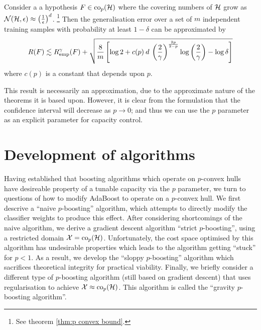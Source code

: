 \begin{theorem}
\label{thm:p convex generalisation}
Consider a a hypothesis $F \in \mathrm{co}_p(\mathcal{H})$ where the covering
numbers of $\mathcal{H}$ grow as $\mathcal{N}({\mathcal{H}}, {\epsilon}) \approx \left
( \frac{1}{\epsilon} \right) ^d$.%
\footnote{See theorem \ref{thm:p convex bound}.}
Then the generalisation error over a set of $m$ independent training
samples with probability at least $1 - \delta$ can be approximated by 
%
\begin{equation}
R(F) \lesssim R_{\mathrm{emp}}^{\gamma}(F) + \sqrt{ \frac{8}{m} \left[ \log 2
+ c(p) \: d \: \left( \frac{2}{\gamma} \right)^{\frac{2p}{2-p}} \log
\left( \frac{2}{\gamma} \right) - \log \delta \right]}
\end{equation}
where $c(p)$ is a constant that depends upon $p$. 
%
\end{theorem}

This result is necessarily an approximation, due to the approximate
nature of the theorems it is based upon.  However, it is clear from
the formulation that the confidence interval will decrease as $p
\rightarrow 0$; and thus we can use the $p$ parameter as an explicit
parameter for capacity control.


\section{Development of algorithms}

Having established that boosting algorithms which operate on
$p$-convex hulls have desireable property of a tunable capacity via
the $p$ parameter, we turn to
questions of how to modify AdaBoost to operate on a $p$-convex hull.
We first descrive a ``naive $p$-boosting'' algorithm, which attempts
to directly modify the classifier weights to produce this effect.
After considering shortcomings of the naive algorithm, we derive a	
gradient descent algorithm ``strict $p$-boosting'', using a restricted
domain $\mathcal{X} = \mathrm{co}_p (\mathcal{H})$.  Unfortunately, the cost space
optimised by this algorithm has undesirable properties which leads to
the algorithm getting ``stuck'' for $p < 1$.  As a result, we develop
the ``sloppy $p$-boosting'' algorithm which sacrifices theoretical
integrity for practical viability.  Finally, we briefly consider a
different type of $p$-boosting algorithm (still based on gradient
descent) that uses regularisation to achieve $\mathcal{X} \approx
\mathrm{co}_p(\mathcal{H})$.  This algorithm is called the ``gravity $p$-boosting
algorithm''.


